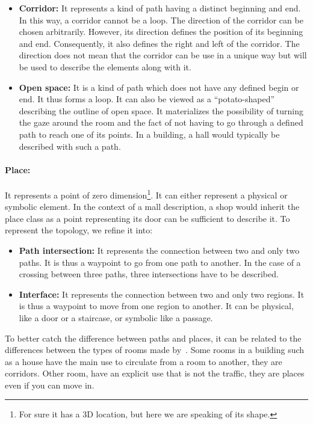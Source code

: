 \begin{itemize}
  \item \textbf{Corridor:} It represents a kind of path having a distinct beginning and end. In this way, a corridor cannot be a loop. The direction of the corridor can be chosen arbitrarily. However, its direction defines the position of its beginning and end. Consequently, it also defines the right and left of the corridor. The direction does not mean that the corridor can be use in a unique way but will be used to describe the elements along with it.
  \item \textbf{Open space:} It is a kind of path which does not have any defined begin or end. It thus forms a loop. It can also be viewed as a ``potato-shaped'' describing the outline of open space. It materializes the possibility of turning the gaze around the room and the fact of not having to go through a defined path to reach one of its points. In a building, a hall would typically be described with such a path.
\end{itemize}

\paragraph{Place:} It represents a point of zero dimension\footnote{For sure it has a 3D location, but here we are speaking of its shape.}. It can either represent a physical or symbolic element. In the context of a mall description, a shop would inherit the place class as a point representing its door can be sufficient to describe it. To represent the topology, we refine it into:
  
\begin{itemize}
  \item \textbf{Path intersection:} It represents the connection between two and only two paths. It is thus a waypoint to go from one path to another. In the case of a crossing between three paths, three intersections have to be described.
  \item \textbf{Interface:} It represents the connection between two and only two regions. It is thus a waypoint to move from one region to another. It can be physical, like a door or a staircase, or symbolic like a passage.
\end{itemize}

To better catch the difference between paths and places, it can be related to the differences between the types of rooms made by~\cite{andresen_2016_wayfinding}. Some rooms in a building such as a house have the main use to circulate from a room to another, they are corridors. Other room, have an explicit use that is not the traffic, they are places even if you can move in.

